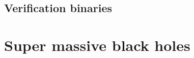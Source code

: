 \documentclass[11pt]{report}
\begin{document}



\subsection{Verification binaries}

\section{Super massive black holes}
\end{document}
